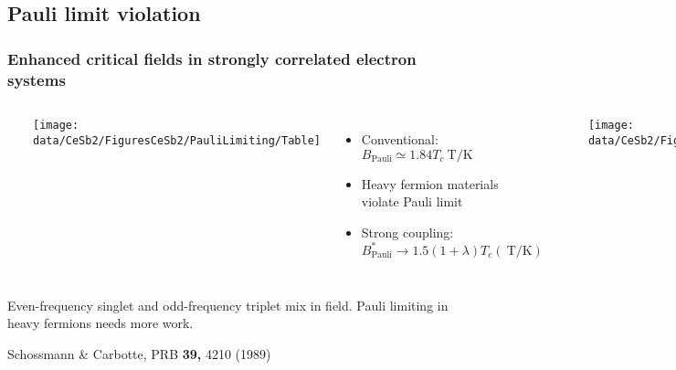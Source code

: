\subsection{Pauli limit violation}
\begin{frame}[label=SuperconTable]
\frametitle{Enhanced critical fields in strongly correlated electron systems}
\begin{columns}[t]
\centerline{~}
\texttt{[image: \\data/CeSb2/FiguresCeSb2/PauliLimiting/Table]}

\begin{itemize}
\item
Conventional: $B_\text{Pauli} \simeq 1.84 T_c \SI{}{\tesla/\kelvin}$
\item
Heavy fermion materials \\
violate Pauli limit
\item
Strong coupling: $B^*_\text{Pauli} \rightarrow 1.5 (1+\lambda) T_c (\SI{}{\tesla/\kelvin})$
\end{itemize}
\centerline{~}
\texttt{[image: \\data/CeSb2/FiguresCeSb2/PauliLimiting/Aperis]}
\end{columns}

\vspace{1em}
\begin{center}
Even-frequency singlet and odd-frequency triplet mix in field.
Pauli limiting in heavy fermions  needs more work.
\end{center}


\vspace{0em}
\centerline{\makebox[\linewidth]{\rule{0.85\textwidth}{0.4pt}}}

\centerline{\scriptsize Schossmann \& Carbotte, PRB {\bf 39,} 4210 (1989)}


\end{frame}


